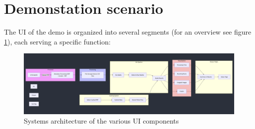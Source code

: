 \documentclass[runningheads]{llncs}
\begin{document}
\section{Demonstation scenario}

The UI of the demo is organized into several segments (for an overview see figure \ref{fig:system-arch}), each serving a specific function:

\begin{figure}[h]
    \centering
    \includegraphics[width=\textwidth]{images/system-arch.png}
    \caption{Systems architecture of the various UI components
    }
    \label{fig:system-arch}
\end{figure}
\end{document}
